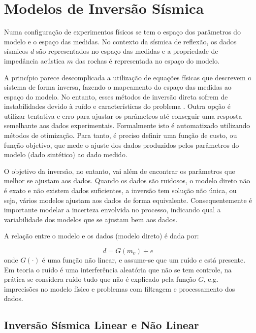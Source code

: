 \chapter{Modelos de Inversão Sísmica}
\label{cap:2modelosInversao}


Numa configuração de experimentos físicos se tem o espaço dos parâmetros do
modelo e o espaço das medidas. No contexto da sísmica de reflexão, os dados
sísmicos $d$ são representados no espaço das medidas e a propriedade de
impedância acústica $m$ das rochas é representada no espaço do modelo.

A princípio parece descomplicada a utilização de equações físicas que descrevem
o sistema de forma inversa, fazendo o mapeamento do espaço das medidas ao espaço
do modelo. No entanto, esses métodos de inversão direta sofrem de instabilidades
devido à ruído e características do problema \citep[p. 50]{sen_livro}. Outra
opção é utilizar tentativa e erro para ajustar os parâmetros até conseguir uma
resposta semelhante aos dados experimentais. Formalmente isto é automatizado
utilizando métodos de otimização. Para tanto, é preciso definir uma função de
custo, ou função objetivo, que mede o ajuste dos dados produzidos pelos
parâmetros do modelo (dado sintético) ao dado medido.

O objetivo da inversão, no entanto, vai além de encontrar os parâmetros que
melhor se ajustam aos dados. Quando os dados são ruidosos, o modelo direto não é
exato e não existem dados suficientes, a inversão tem solução não única, ou
seja, vários modelos ajustam aos dados de forma equivalente. Consequentemente é
importante modelar a incerteza envolvida no processo, indicando qual a
variabilidade dos modelos que se ajustam bem aos dados.

A relação entre o modelo e os dados (modelo direto) é dada por:

\begin{equation}
d = G(m_v) + e
\end{equation}
onde $G(\cdot)$ é uma função não linear, e assume-se que um ruído $e$ está
presente. Em teoria o ruído é uma interferência aleatória que não se tem
controle, na prática se considera ruído tudo que não é explicado pela função
$G$, e.g. imprecisões no modelo físico e problemas com filtragem e processamento
dos dados.

\section{Inversão Sísmica Linear e Não Linear}

